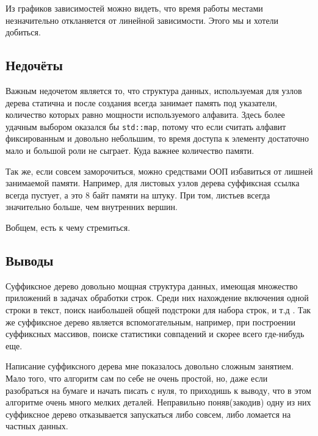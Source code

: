 \documentclass[12pt]{article}
\begin{document}
Из графиков зависимостей можно видеть, что время работы местами незначительно откланяется от линейной зависимости. Этого мы и хотели добиться.

\subsection*{Недочёты}

Важным недочетом является то, что структура данных, используемая для узлов дерева статична и после создания всегда занимает память под указатели, количество которых равно мощности используемого алфавита. Здесь более удачным выбором оказался бы \verb|std::map|, потому что если считать алфавит фиксированным и довольно небольшим, то время доступа к элементу достаточно мало и большой роли не сыграет. Куда важнее количество памяти.

Так же, если совсем заморочиться, можно средствами ООП избавиться от лишней занимаемой памяти. Например, для листовых узлов дерева суффиксная ссылка всегда пустует, а это 8 байт памяти на штуку. При том, листьев всегда значительно больше, чем внутренних вершин.

Вобщем, есть к чему стремиться.

\subsection*{Выводы}

Суффиксное дерево довольно мощная структура данных, имеющая множество приложений в задачах обработки строк. Среди них нахождение включения одной строки в текст, поиск наибольшей общей подстроки для набора строк, и т.д . Так же суффиксное дерево является вспомогательным, например, при построении суффиксных массивов, поиске статистики совпадений и скорее всего где-нибудь еще.

Написание суффиксного дерева мне показалось довольно сложным занятием.
Мало того, что алгоритм сам по себе не очень простой, но, даже если разобраться на бумаге и начать писать с нуля, то приходишь к выводу, что в этом алгоритме очень много мелких деталей. Неправильно поняв(закодив) одну из них суффиксное дерево отказывается запускаться либо совсем, либо ломается на частных данных.
\end{document}
